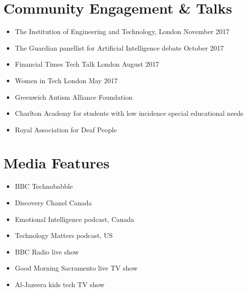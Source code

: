 \section{Community Engagement \& Talks}
\begin{itemize}
    \item The Institution of Engineering and Technology, London November 2017
    \item The Guardian panellist for Artificial Intelligence debate October 2017
    \item Financial Times Tech Talk London August 2017
    \item Women in Tech London May 2017
    \item Greenwich Autism Alliance Foundation 
    \item Charlton Academy for students with low incidence special educational needs
    \item Royal Association for Deaf People 
\end{itemize}

\section{Media Features}
\begin{itemize}
    \item BBC Technobabble 
    \item Discovery Chanel Canada 
    \item Emotional Intelligence podcast, Canada 
    \item Technology Matters podcast, US 
    \item BBC Radio live show 
    \item Good Morning Sacramento live TV show 
    \item Al-Jazeera kids tech TV show
\end{itemize}
